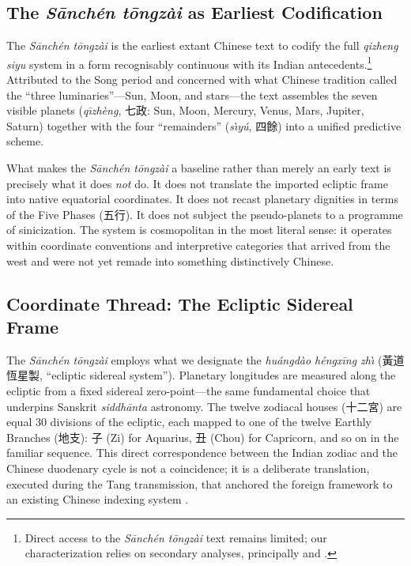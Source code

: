 \documentclass[10pt,a4paper]{article}
\newcommand{\zh}[1]{#1}
\begin{document}
\subsection*{The \textit{S\={a}nch\'{e}n t\={o}ngz\`{a}i} as Earliest Codification}

The \textit{S\={a}nch\'{e}n t\={o}ngz\`{a}i} is the earliest extant Chinese text to codify the full
\textit{qizheng siyu} system in a form recognisably continuous with its Indian
antecedents.\footnote{Direct access to the \textit{S\={a}nch\'{e}n t\={o}ngz\`{a}i} text remains limited;
our characterization relies on secondary analyses, principally
\citealt{ho2003astrology} and \citealt{mak2014pseudoplanets}.}
Attributed to the Song period and concerned with what Chinese tradition called
the ``three luminaries''---Sun, Moon, and stars---the text assembles the
seven visible planets (\textit{q\={\i}zh\`eng}, \zh{七政}: Sun, Moon, Mercury, Venus, Mars, Jupiter,
Saturn) together with the four ``remainders'' (\textit{s\`{\i}y\'u}, \zh{四餘}) into a unified
predictive scheme.

What makes the \textit{S\={a}nch\'{e}n t\={o}ngz\`{a}i} a baseline rather than merely an early text
is precisely what it does \emph{not} do.  It does not translate the imported
ecliptic frame into native equatorial coordinates.  It does not recast
planetary dignities in terms of the Five Phases (\zh{五行}).  It does not
subject the pseudo-planets to a programme of sinicization.  The system
is cosmopolitan in the most literal sense: it operates within coordinate
conventions and interpretive categories that arrived from the west and
were not yet remade into something distinctively Chinese.

\subsection*{Coordinate Thread: The Ecliptic Sidereal Frame}

The \textit{S\={a}nch\'{e}n t\={o}ngz\`{a}i} employs what we designate the \textit{hu\'{a}ngd\`ao h\'{e}ngx\=ing zh\`{\i}} (\zh{黃道恆星製}, ``ecliptic sidereal
system'').  Planetary longitudes are measured along the ecliptic from a
fixed sidereal zero-point---the same fundamental choice that underpins
Sanskrit \textit{siddh\={a}nta} astronomy.  The twelve zodiacal houses
(\zh{十二宮}) are equal 30\textdegree{} divisions of the ecliptic, each
mapped to one of the twelve Earthly Branches (\zh{地支}): \zh{子} (Zi)
for Aquarius, \zh{丑} (Chou) for Capricorn, and so on in the familiar
sequence.  This direct correspondence between the Indian zodiac and the
Chinese duodenary cycle is not a coincidence; it is a deliberate
translation, executed during the Tang transmission, that anchored the
foreign framework to an existing Chinese indexing system
\citep{kotyk2018sinicization}.
\end{document}
